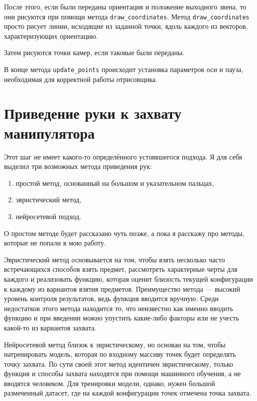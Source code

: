 \documentclass[14pt, a4paper]{extarticle}
\begin{document}
После этого, если были переданы ориентация и положение выходного звена, то они
рисуются при помощи метода \texttt{draw\_coordinates}.
Метод \texttt{draw\_coordinates} просто рисует линии, исходящие из заданной
точки, вдоль каждого из векторов, характеризующих ориентацию.

Затем рисуются точки камер, если таковые были переданы.

В конце метода \texttt{update\_points} происходит установка параметров оси и
пауза, необходимая для корректной работы отрисовщика.


\section{Приведение руки к захвату манипулятора}
Этот шаг не имеет какого-то определённого устоявшегося подхода. Я для
себя выделил три возможных метода приведения рук:
\begin{enumerate}
    \item простой метод, основанный на большом и указательном пальцах,
    \item эвристический метод,
    \item нейросетевой подход.
\end{enumerate}
О простом методе будет рассказано чуть позже, а пока я расскажу про методы,
которые не попали в мою работу.

Эвристический метод основывается на том, чтобы взять несколько часто
встречающихся способов взять предмет, рассмотреть характерные черты для каждого
и реализовать функцию, которая оценит близость текущей конфигурации к каждому
из вариантов взятия предметов. Преимущество метода --- высокий уровень контроля
результатов, ведь функция вводится вручную. Среди недостатков этого метода
находится то, что неизвестно как именно вводить функцию и при введении можно
упустить какие-либо факторы или не учесть какой-то из вариантов захвата.

Нейросетевой метод близок к эвристическому, но основан на том, чтобы
натренировать модель, которая по входному массиву точек будет определять точку
захвата. По сути своей этот метод идентичен эвристическому, только функция и
способы захвата находятся при помощи машинного обучения, а не вводятся
человеком. Для тренировки модели, однако, нужен большой размеченный датасет,
где на каждой конфигурации точек отмечена точка захвата.
\end{document}

